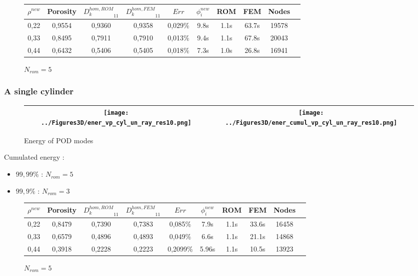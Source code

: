\ligneinter

\begin{figure}[H]%
%
\begin{center}
\begin{tabular}{|c|c||c|c||c|c||c|c||c||c|}
\hline
$\rho^{new}$&Porosity&${D_k^{hom,ROM}}_{11}$&${D_k^{hom,FEM}}_{11}$&$Err$&$\phi_i^{new}$&ROM&FEM&Nodes\\
\hline
0,22&0,9554&0,9360&0,9358&0,029\%&9.8s&1.1s&63.7s&19578\\
\hline
0,33&0,8495&0,7911&0,7910&0,013\%&9.4s&1.1s&67.8s&20043\\
\hline
0,44&0,6432&0,5406&0,5405&0,018\%&7.3s&1.0s&26.8s&16941\\
\hline
\end{tabular}
\end{center}
\caption{$N_{rom}=5$}
%
\end{figure}

\subsubsection{A single cylinder}

\begin{figure}[H]
\begin{center}
\begin{tabular}{|c|c|}
\hline
\texttt{[image: ../Figures3D/ener\_vp\_cyl\_un\_ray\_res10.png]}
&%
\texttt{[image: ../Figures3D/ener\_cumul\_vp\_cyl\_un\_ray\_res10.png]}
\\ \hline
\end{tabular}
\end{center}
\caption{Energy of POD modes}
\end{figure}

\begin{multicols}{2}
Cumulated energy :

\columnbreak
\begin{itemize}
\item $99,99\%$ : $N_{rom}=5$
\item $99,9\%$ : $N_{rom}=3$
\end{itemize}
%
\end{multicols}

\ligneinter

\begin{figure}[H]%
%
\begin{center}
\begin{tabular}{|c|c||c|c||c|c||c|c||c||c|}
\hline
$\rho^{new}$&Porosity&${D_k^{hom,ROM}}_{11}$&${D_k^{hom,FEM}}_{11}$&$Err$&$\phi_i^{new}$&ROM&FEM&Nodes\\
\hline
0,22&0,8479&0,7390&0,7383&0,085\%&7.9s&1.1s&33.6s&16458\\
\hline
0,33&0,6579&0,4896&0,4893&0,049\%&6.6s&1.1s&21.1s&14868\\
\hline
0,44&0,3918&0,2228&0,2223&0,2099\%&5.96s&1.1s&10.5s&13923\\
\hline
\end{tabular}
\end{center}
\caption{$N_{rom}=5$}
%
\end{figure}

